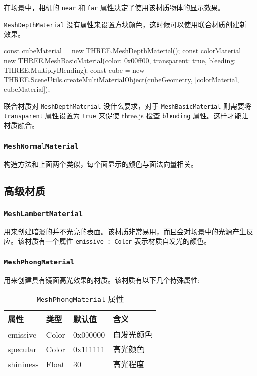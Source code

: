 在场景中，相机的 \texttt{near} 和 \texttt{far} 属性决定了使用该材质物体的显示效果。

\texttt{MeshDepthMaterial} 没有属性来设置方块颜色，这时候可以使用联合材质创建新效果。

\begin{JavaScript}
const cubeMaterial = new THREE.MeshDepthMaterial();
const colorMaterial = new THREE.MeshBasicMaterial({color: 0x00ff00, transparent: true, bleeding: THREE.MultiplyBlending});
const cube = new THREE.SceneUtils.createMultiMaterialObject(cubeGeometry, [colorMaterial, cubeMaterial]);
\end{JavaScript}

联合材质对 \texttt{MeshDepthMaterial} 没什么要求，对于 \texttt{MeshBasicMaterial} 则需要将 \texttt{transparent} 属性设置为 \texttt{true} 来促使 three.js 检查 \texttt{blending} 属性。这样才能让材质融合。

\subsubsection*{\texttt{MeshNormalMaterial}}

构造方法和上面两个类似，每个面显示的颜色与面法向量相关。

\subsection{高级材质}

\subsubsection*{\texttt{MeshLambertMaterial}}

用来创建暗淡的并不光亮的表面。该材质非常易用，而且会对场景中的光源产生反应。该材质有一个属性 \texttt{emissive : Color} 表示材质自发光的颜色。

\subsubsection*{\texttt{MeshPhongMaterial}}

用来创建具有镜面高光效果的材质。该材质有以下几个特殊属性:

\begin{table}[H]
  \centering
  \small
  \caption{\texttt{MeshPhongMaterial} 属性}
  \setlength{\tabcolsep}{4mm}
  \begin{tabular}{l|l|l|l}
    \toprule
    \textbf{属性} & \textbf{类型} & \textbf{默认值} & \textbf{含义} \\
    \midrule
    emissive & Color & 0x000000 & 自发光颜色 \\
    specular & Color & 0x111111 & 高光颜色 \\
    shininess & Float & 30 & 高光程度 \\
    \bottomrule
  \end{tabular}
\end{table}

